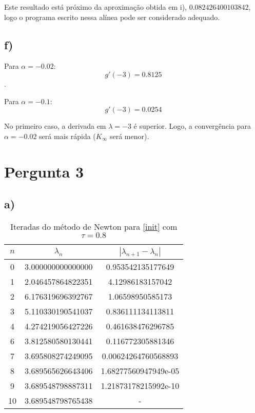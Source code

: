 \documentclass[a4paper, 18pt]{article}
\begin{document}
	\par
	Este resultado está próximo da aproximação obtida em i), $0.082426400103842$, logo o programa escrito nessa alínea pode ser considerado adequado.

\subsection*{f)}
	\par
	Para $\alpha = -0.02$:
	$$g'(-3) = 0.8125$$.

	\par
	Para $\alpha = -0.1$:
	$$g'(-3) = 0.0254$$

	No primeiro caso, a derivada em $\lambda = -3$ é superior. Logo, a convergência para $\alpha = -0.02$ será mais rápida ($K_\infty$ será menor).


\section{Pergunta 3}
\subsection*{a)}
	\begin{table}[H]
		\setlength{\tabcolsep}{0.5cm} %
		\renewcommand{\arraystretch}{1.5} %
		\centering
		\caption{Iteradas do método de Newton para \eqref{init} com $\tau = 0.8$}
		\label{}
		\begin{tabular}{|c|c|c|}
			$n$ & $\lambda _n$ &  $| \lambda _{n+1} - \lambda _n |$ \\\hline
			0 & 3.000000000000000  & 0.953542135177649  \\
			1 & 2.046457864822351  & 4.12986183157042 \\
   			2 & 6.176319696392767  & 1.06598950585173 \\
   			3 & 5.110330190541037  & 0.836111134113811 \\
   			4 & 4.274219056427226  & 0.461638476296785 \\
   			6 & 3.812580580130441  & 0.116772305881346 \\
   			7 & 3.695808274249095  & 0.00624264760568893 \\
   			8 & 3.689565626643406  & 1.68277560947949e-05 \\
   			9 & 3.689548798887311  & 1.21873178215992e-10 \\
   			10 & 3.689548798765438 & - \\
		\end{tabular}
	\end{table}
\end{document}

